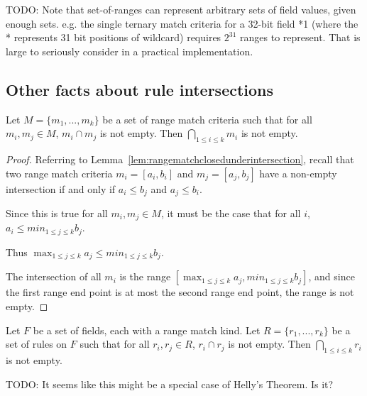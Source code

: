 \documentclass[acmsmall]{acmart}
\newcommand{\todo}[1]{}
\renewcommand{\todo}[1]{{\color{red} TODO: {#1}}}
\begin{document}
\todo{Note that set-of-ranges can represent arbitrary sets of field values, given enough sets.  e.g. the single ternary match criteria for a 32-bit field *1 (where the * represents 31 bit positions of wildcard) requires $2^{31}$ ranges to represent.  That is large to seriously consider in a practical implementation.}


\subsection{Other facts about rule intersections}

\begin{lemma}
\label{lem:rangefieldpairwiseintersectionimpliescommonintersection}
Let $M = \{m_1, ..., m_k\}$ be a set of range match criteria
such that for all $m_i, m_j \in M$, $m_i \cap m_j$ is not empty.
Then $\bigcap_{1 \leq i \leq k} m_i$ is not empty.
\end{lemma}

\begin{proof}
Referring to Lemma~\ref{lem:rangematchclosedunderintersection},
recall that two range match criteria $m_i = [a_i, b_i]$
and $m_j = [a_j, b_j]$ have a non-empty intersection
if and only if $a_i \leq b_j$ and $a_j \leq b_i$.

Since this is true for all $m_i, m_j \in M$,
it must be the case that for all $i$,
$a_i \leq min_{1 \leq j \leq k} b_j$.

Thus $\max_{1 \leq j \leq k} a_j \leq min_{1 \leq j \leq k} b_j$.

The intersection of all $m_i$ is the range
$[\max_{1 \leq j \leq k} a_j, min_{1 \leq j \leq k} b_j]$,
and since the first range end point is at most
the second range end point, the range is not empty.
\end{proof}


\begin{theorem}
\label{thm:rangerulepairwiseintersectionimpliescommonintersection}
Let $F$ be a set of fields, each with a range match kind.
Let $R = \{r_1, ..., r_k\}$ be a set of rules on $F$
such that for all $r_i, r_j \in R$, $r_i \cap r_j$ is not empty.
Then $\bigcap_{1 \leq i \leq k} r_i$ is not empty.
\end{theorem}

\todo{It seems like this might be a special case of Helly's Theorem.  Is it?}
\end{document}
